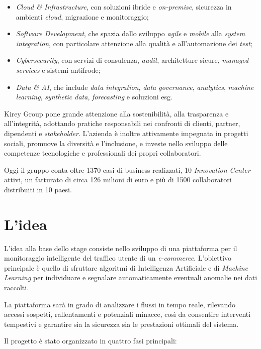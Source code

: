 \begin{itemize}
    \item \emph{Cloud \& Infrastructure}, con soluzioni ibride e \emph{on-premise}, sicurezza in ambienti \emph{cloud}, migrazione e monitoraggio;
    \item \emph{Software Development}, che spazia dallo sviluppo \emph{agile} e \emph{mobile} alla \emph{system integration}, con particolare attenzione alla qualità e all'automazione dei \emph{test};
    \item \emph{Cybersecurity}, con servizi di consulenza, \emph{audit}, architetture sicure, \emph{managed services} e sistemi antifrode;
    \item \emph{Data \& AI}, che include \emph{data integration}, \emph{data governance}, \emph{analytics}, \emph{machine learning}, \emph{synthetic data}, \emph{forecasting} e soluzioni \gls{esg}\glsfirstoccur.
\end{itemize}

Kirey Group pone grande attenzione alla sostenibilità, alla trasparenza e all'integrità, adottando pratiche responsabili nei confronti di clienti, partner, dipendenti e \emph{stakeholder}. 
L'azienda è inoltre attivamente impegnata in progetti sociali, promuove la diversità e l'inclusione, e investe nello sviluppo delle competenze tecnologiche e professionali dei propri collaboratori.

Oggi il gruppo conta oltre 1370 casi di business realizzati, 10 \emph{Innovation Center} attivi, un fatturato di circa 126 milioni di euro e più di 1500 collaboratori distribuiti in 10 paesi.


\section{L'idea}

L'idea alla base dello stage consiste nello sviluppo di una piattaforma per il monitoraggio intelligente del traffico utente di un \emph{e-commerce}. L'obiettivo principale è quello di sfruttare algoritmi di Intelligenza Artificiale e di \emph{Machine Learning} per individuare e segnalare automaticamente eventuali anomalie nei dati raccolti.

La piattaforma sarà in grado di analizzare i flussi in tempo reale, rilevando accessi sospetti, rallentamenti e potenziali minacce, così da consentire interventi tempestivi e garantire sia la sicurezza sia le prestazioni ottimali del sistema.

Il progetto è stato organizzato in quattro fasi principali:


